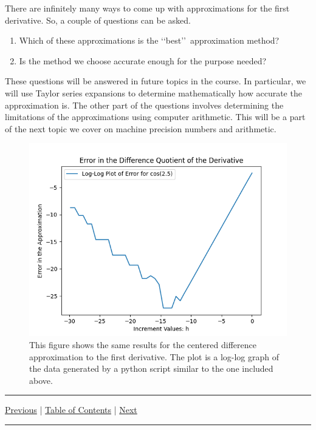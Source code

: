 \documentclass[10pt,fleqn]{article}
\begin{document}
There are infinitely many ways to come up with approximations for the first
derivative. So, a couple of questions can be asked.
\begin{enumerate}
  \item Which of these approximations is the \lq\lq best\rq\rq\ approximation
        method?
  \item Is the method we choose accurate enough for the purpose needed?
\end{enumerate}
These questions will be answered in future topics in the course. In particular,
we will use Taylor series expansions to determine mathematically how accurate
the approximation is. The other part of the questions involves determining the
limitations of the approximations using computer arithmetic. This will be a part
of the next topic we cover on machine precision numbers and arithmetic.
\vfill
\begin{figure}[h]
\centering
\includegraphics{../images/diff_quotient_02.png}
\vskip0.1in
\caption{This figure shows the same results for the centered difference
approximation to the first derivative. The plot is a log-log graph of the data
generated by a python script similar to the one included above.}
\end{figure}
\eject
\vskip0.1in\hrule\vskip0.1in \noindent
  \href{../../topic_08/md/topic_08.md}{Previous} |
  \href{../../toc/md/topic_toc.md}{Table of Contents} |
  \href{../../topic_10/md/topic_10.md}{Next}
\vskip0.1in\hrule\vskip0.1in \noindent
\end{document}
